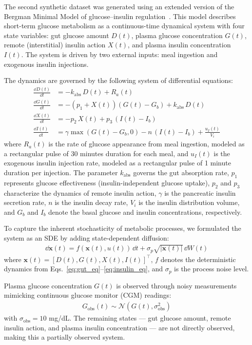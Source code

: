 \documentclass[preprint,12pt]{elsarticle}
\begin{document}
The second synthetic dataset was generated using an extended version of the Bergman Minimal Model of glucose--insulin regulation~\citep{bergman1979quantitative}. This model describes short-term glucose metabolism as a continuous-time dynamical system with four state variables: gut glucose amount $D(t)$, plasma glucose concentration $G(t)$, remote (interstitial) insulin action $X(t)$, and plasma insulin concentration $I(t)$. The system is driven by two external inputs: meal ingestion and exogenous insulin injections.

The dynamics are governed by the following system of differential equations:
\begin{align}
    \frac{\dd D(t)}{\dd t} &= -k_{\text{abs}} \, D(t) + R_a(t) \label{eq:gut_eq} \\
    \frac{\dd G(t)}{\dd t} &= -(p_1 + X(t))(G(t) - G_b) + k_{\text{abs}} \, D(t) \label{eq:glucose_eq} \\
    \frac{\dd X(t)}{\dd t} &= -p_2 \, X(t) + p_3 \, (I(t) - I_b) \label{eq:remote_insulin_eq} \\
    \frac{\dd I(t)}{\dd t} &= \gamma \max(G(t) - G_b, 0) - n \, (I(t) - I_b) + \frac{u_I(t)}{V_i} \label{eq:insulin_eq}
\end{align}
where $R_a(t)$ is the rate of glucose appearance from meal ingestion, modeled as a rectangular pulse of 30 minutes duration for each meal, and $u_I(t)$ is the exogenous insulin injection rate, modeled as a rectangular pulse of 1 minute duration per injection. The parameter $k_{\text{abs}}$ governs the gut absorption rate, $p_1$ represents glucose effectiveness (insulin-independent glucose uptake), $p_2$ and $p_3$ characterize the dynamics of remote insulin action, $\gamma$ is the pancreatic insulin secretion rate, $n$ is the insulin decay rate, $V_i$ is the insulin distribution volume, and $G_b$ and $I_b$ denote the basal glucose and insulin concentrations, respectively.

To capture the inherent stochasticity of metabolic processes, we formulated the system as an SDE by adding state-dependent diffusion:
\begin{align}
    \dd \mathbf{x}(t) = f(\mathbf{x}(t), u(t)) \, \dd t + \sigma_p \sqrt{|\mathbf{x}(t)|} \, \dd W(t)
    \label{eq:glucose_sde}
\end{align}
where $\mathbf{x}(t) = [D(t), G(t), X(t), I(t)]^\top$, $f$ denotes the deterministic dynamics from Eqs.~\eqref{eq:gut_eq}--\eqref{eq:insulin_eq}, and $\sigma_p$ is the process noise level.

Plasma glucose concentration $G(t)$ is observed through noisy measurements mimicking continuous glucose monitor (CGM) readings:
\begin{align}
    G_{\text{obs}}(t) \sim \mathcal{N}(G(t), \sigma_{\text{obs}}^2)
    \label{eq:glucose_obs}
\end{align}
with $\sigma_{\text{obs}} = 10$ mg/dL. The remaining states --- gut glucose amount, remote insulin action, and plasma insulin concentration --- are not directly observed, making this a partially observed system.
\end{document}

